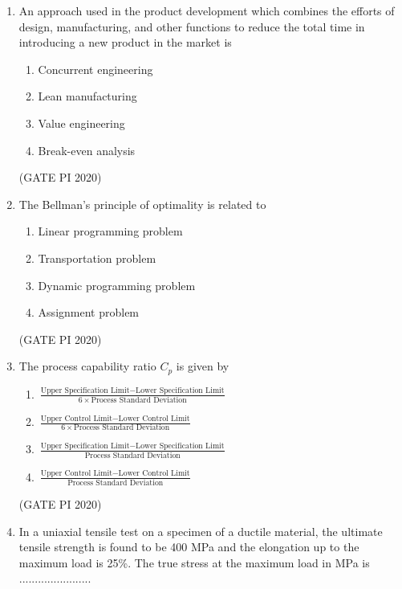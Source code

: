 \documentclass[journal,12pt,onecolumn]{IEEEtran}
\theoremstyle{remark}
\begin{document}
\begin{enumerate}
\item An approach used in the product development which combines the efforts of design, manufacturing, and other functions to reduce the total time in introducing a new product in the market is
\begin{enumerate}
    \item Concurrent engineering
    \item Lean manufacturing
    \item Value engineering
    \item Break-even analysis
\end{enumerate}

\hfill (GATE PI 2020)

\item The Bellman's principle of optimality is related to
\begin{enumerate}
    \item Linear programming problem
    \item Transportation problem
    \item Dynamic programming problem
    \item Assignment problem
\end{enumerate}

\hfill (GATE PI 2020)

\item The process capability ratio $C_p$ is given by 

\begin{enumerate}
\setlength{\itemsep}{1em}
\item $\frac{\text{Upper Specification Limit} - \text{Lower Specification Limit}}{6 \times \text{Process Standard Deviation}}$
\item $\frac{\text{Upper Control Limit} - \text{Lower Control Limit}}{6 \times \text{Process Standard Deviation}}$
\item $\frac{\text{Upper Specification Limit} - \text{Lower Specification Limit}}{\text{Process Standard Deviation}}$
\item $\frac{\text{Upper Control Limit} - \text{Lower Control Limit}}{\text{Process Standard Deviation}}$
\end{enumerate}

\hfill (GATE PI 2020)

\item In a uniaxial tensile test on a specimen of a ductile material, the ultimate tensile strength is found to be 400 MPa and the elongation up to the maximum load is 25\%. The true stress at the maximum load in MPa is .......................


\end{enumerate}
\end{document}
